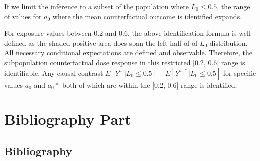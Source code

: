 \documentclass[dvipdfmx,10pt]{article}
\begin{document}
\begin{enumerate}
If we limit the inference to a subset of the population where \(L_{0} \le 0.5\), the range of values for \(a_{0}\) where the mean counterfactual outcome is identified expands.

For exposure values between 0.2 and 0.6, the above identification formula is well defined as the shaded positive area does span the left half of of \(L_{0}\) distribution. All necessary conditional expectations are defined and observable. Therefore, the subpopulation counterfactual dose response in this restricted [0.2, 0.6] range is identifiable. Any causal contrast \(E[Y^{a_{0}} | L_{0} \le 0.5] - E[Y^{a_{0}*} | L_{0} \le 0.5]\) for specific values \(a_{0}\) and \(a_{0}*\) both of which are within the [0.2, 0.6] range is identified.
\end{enumerate}


\section{Bibliography Part}
\label{sec:orge3655d0}
\subsection{Bibliography}
\label{sec:orgf998314}
\renewcommand{\section}[2]{}



\end{document}
